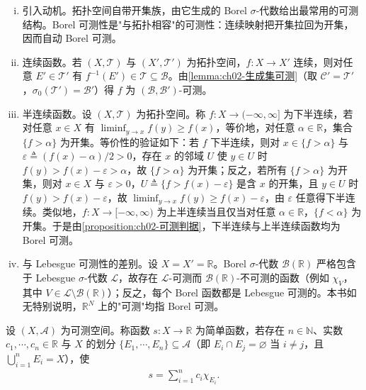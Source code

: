 \documentclass[../../main.tex]{subfiles}%
\begin{document}
\begin{remark}\label{remark:ch02-连续半连续Borel}
\label{remark:ch02-连续Borel}\label{remark:ch02-连续逼近注}
\begin{enumerate}[(i)]
\item 引入动机。拓扑空间自带开集族，由它生成的 Borel $\sigma$-代数给出最常用的可测结构。Borel 可测性是"与拓扑相容"的可测性：连续映射把开集拉回为开集，因而自动 Borel 可测。
\item 连续函数。若 $(X,\mathscr T)$ 与 $(X',\mathscr T')$ 为拓扑空间，$f:X\to X'$ 连续，则对任意 $E'\in\mathscr T'$ 有 $f^{-1}(E')\in\mathscr T\subseteq\mathscr B$。由\cref{lemma:ch02-生成集可测}（取 $\mathscr C'=\mathscr T'$，$\sigma_0(\mathscr T')=\mathscr B'$）得 $f$ 为 $(\mathscr B,\mathscr B')$-可测。
\item 半连续函数。设 $(X,\mathscr T)$ 为拓扑空间。称 $f:X\to(-\infty,\infty]$ 为下半连续，若对任意 $x\in X$ 有 $\liminf_{y\to x}f(y)\geqslant f(x)$，等价地，对任意 $\alpha\in\mathbb{R}$，集合 $\{f>\alpha\}$ 为开集。等价性的验证如下：若 $f$ 下半连续，则对 $x\in\{f>\alpha\}$ 与 $\varepsilon\triangleq(f(x)-\alpha)/2>0$，存在 $x$ 的邻域 $U$ 使 $y\in U$ 时 $f(y)>f(x)-\varepsilon>\alpha$，故 $\{f>\alpha\}$ 为开集；反之，若所有 $\{f>\alpha\}$ 为开集，则对 $x\in X$ 与 $\varepsilon>0$，$U\triangleq\{f>f(x)-\varepsilon\}$ 是含 $x$ 的开集，且 $y\in U$ 时 $f(y)>f(x)-\varepsilon$，故 $\liminf_{y\to x}f(y)\geqslant f(x)-\varepsilon$，由 $\varepsilon$ 任意得下半连续。类似地，$f:X\to[-\infty,\infty)$ 为上半连续当且仅当对任意 $\alpha\in\mathbb{R}$，$\{f<\alpha\}$ 为开集。于是由\cref{proposition:ch02-可测判据}，下半连续与上半连续函数均为 Borel 可测。
\item 与 Lebesgue 可测性的差别。设 $X=X'=\mathbb{R}$。Borel $\sigma$-代数 $\mathscr B(\mathbb{R})$ 严格包含于 Lebesgue $\sigma$-代数 $\mathscr L$，故存在 $\mathscr L$-可测而 $\mathscr B(\mathbb{R})$-不可测的函数（例如 $\chi_V$，其中 $V\in\mathscr L\setminus\mathscr B(\mathbb{R})$）；反之，每个 Borel 函数都是 Lebesgue 可测的。本书如无特别说明，$\mathbb{R}^N$ 上的"可测"均指 Borel 可测。
\end{enumerate}
\end{remark}

\begin{definition}\label{definition:ch02-简单函数}
设 $(X,\mathscr A)$ 为可测空间。称函数 $s:X\to\mathbb{R}$ 为简单函数，若存在 $n\in\mathbb{N}$、实数 $c_1,\cdots,c_n\in\mathbb{R}$ 与 $X$ 的划分 $\{E_1,\cdots,E_n\}\subseteq\mathscr A$（即 $E_i\cap E_j=\varnothing$ 当 $i\neq j$，且 $\bigcup_{i=1}^n E_i=X$），使
\begin{align*}
s=\sum_{i=1}^n c_i\chi_{E_i}.
\end{align*}
\end{definition}
\end{document}
